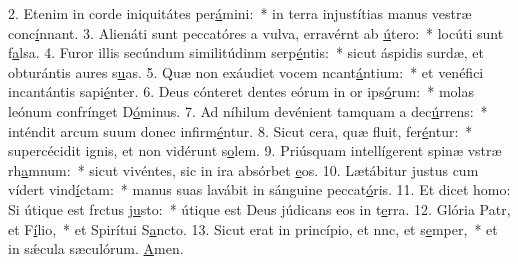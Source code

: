 2. Etenim in corde iniquitátes per\uline{á}mini:~* in terra injustítias manus vestræ conc\uline{í}nnant.
3. Alienáti sunt peccatóres a vulva, erravérnt ab \uline{ú}tero:~* locúti sunt f\uline{a}lsa.
4. Furor illis secúndum similitúdinm serp\uline{é}ntis:~* sicut áspidis surdæ, et obturántis aures s\uline{u}as.
5. Quæ non exáudiet vocem ncant\uline{á}ntium:~* et venéfici incantántis sapi\uline{é}nter.
6. Deus cónteret dentes eórum in or ips\uline{ó}rum:~* molas leónum confrínget D\uline{ó}minus.
7. Ad níhilum devénient tamquam a dec\uline{ú}rrens:~* inténdit arcum suum donec infirm\uline{é}ntur.
8. Sicut cera, quæ fluit, fer\uline{é}ntur:~* supercécidit ignis, et non vidérunt s\uline{o}lem.
9. Priúsquam intellígerent spinæ vstræ rh\uline{a}mnum:~* sicut vivéntes, sic in ira absórbet \uline{e}os.
10. Lætábitur justus cum vídert vind\uline{í}ctam:~* manus suas lavábit in sánguine peccat\uline{ó}ris.
11. Et dicet homo: Si útique est frctus j\uline{u}sto:~* útique est Deus júdicans eos in t\uline{e}rra.
12. Glória Patr, et F\uline{í}lio,~* et Spirítui S\uline{a}ncto.
13. Sicut erat in princípio, et nnc, et s\uline{e}mper,~* et in sǽcula sæculórum. \uline{A}men.
